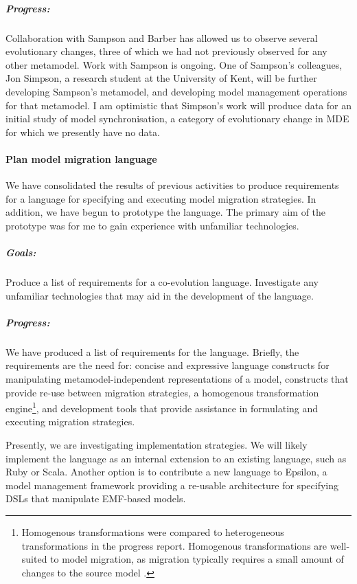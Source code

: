 \subparagraph{Progress:} Collaboration with Sampson and Barber has allowed us to observe several evolutionary changes, three of which we had not previously observed for any other metamodel. Work with Sampson is ongoing. One of Sampson's colleagues, Jon Simpson, a research student at the University of Kent, will be further developing Sampson's metamodel, and developing model management operations for that metamodel. I am optimistic that Simpson's work will produce data for an initial study of model synchronisation, a category of evolutionary change in MDE for which we presently have no data.



\paragraph{Plan model migration language} %
\label{par:plan_metamodel_evolution_language}
We have consolidated the results of previous activities to produce requirements for a language for specifying and executing model migration strategies. In addition, we have begun to prototype the language. The primary aim of the prototype was for me to gain experience with unfamiliar technologies.

\subparagraph{Goals:} Produce a list of requirements for a co-evolution language. Investigate any unfamiliar technologies that may aid in the development of the language.

\subparagraph{Progress:} We have produced a list of requirements for the language. Briefly, the requirements are the need for: concise and expressive language constructs for manipulating metamodel-independent representations of a model, constructs that provide re-use between migration strategies, a homogenous transformation engine\footnote{Homogenous transformations were compared to heterogeneous transformations in the progress report. Homogenous transformations are well-suited to model migration, as migration typically requires a small amount of changes to the source model \cite{sprinkle03thesis}.}, and development tools that provide assistance in formulating and executing migration strategies.

Presently, we are investigating implementation strategies. We will likely implement the language as an internal extension to an existing language, such as Ruby or Scala. Another option is to contribute a new language to Epsilon, a model management framework providing a re-usable architecture for specifying DSLs that manipulate EMF-based models.


